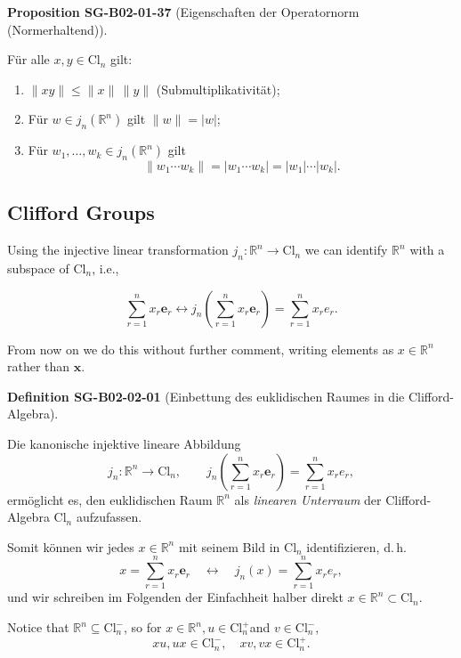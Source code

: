 \documentclass[10pt, letterpaper]{article}
\newcommand{\R}{\mathbb{R}}
\newcommand{\Cl}{\mathrm{Cl}}
\newcommand{\CustomHeading}[3]{%
  \par\medskip\noindent%
  \textbf{#1 #2} \textnormal{(#3)}.\enskip%
}
\newenvironment{DEF}[2]{\begin{unitbox}\CustomHeading{Definition}{#1}{#2}}{\end{unitbox}}
\newenvironment{PROP}[2]{\begin{unitbox}\CustomHeading{Proposition}{#1}{#2}}{\end{unitbox}}
\begin{document}
\begin{PROP}{SG-B02-01-37}{Eigenschaften der Operatornorm (Normerhaltend)}
Für alle $x,y \in \Cl_n$ gilt:
\begin{enumerate}[label=(\roman*)]
\item $\|xy\| \le \|x\|\,\|y\|$ (Submultiplikativität);
\item Für $w \in j_n(\R^n)$ gilt $\|w\| = |w|$;
\item Für $w_1,\ldots,w_k \in j_n(\R^n)$ gilt
\[
\|w_1 \cdots w_k\| = |w_1 \cdots w_k| = |w_1|\cdots|w_k|.
\]
\end{enumerate}
\end{PROP}





\pagebreak

\subsection{Clifford Groups}


Using the injective linear transformation $j_{n}: \mathbb{R}^{n} \longrightarrow \mathrm{Cl}_{n}$ we can identify $\mathbb{R}^{n}$ with a subspace of $\mathrm{Cl}_{n}$, i.e.,

$$
\sum_{r=1}^{n} x_{r} \mathbf{e}_{r} \longleftrightarrow j_{n}\left(\sum_{r=1}^{n} x_{r} \mathbf{e}_{r}\right)=\sum_{r=1}^{n} x_{r} e_{r} .
$$

From now on we do this without further comment, writing elements as $x \in \mathbb{R}^{n}$ rather than $\mathbf{x}$.



\begin{DEF}{SG-B02-02-01}{Einbettung des euklidischen Raumes in die Clifford-Algebra}
Die kanonische injektive lineare Abbildung
\[
j_n : \R^n \longrightarrow \Cl_n, 
\qquad 
j_n\!\left(\sum_{r=1}^n x_r \mathbf{e}_r\right) = \sum_{r=1}^n x_r e_r,
\]
ermöglicht es, den euklidischen Raum $\R^n$ als \emph{linearen Unterraum} der Clifford-Algebra $\Cl_n$ aufzufassen.

Somit können wir jedes $x \in \R^n$ mit seinem Bild in $\Cl_n$ identifizieren, d.\,h.
\[
x = \sum_{r=1}^n x_r \mathbf{e}_r
\quad\longleftrightarrow\quad
j_n(x) = \sum_{r=1}^n x_r e_r,
\]
und wir schreiben im Folgenden der Einfachheit halber direkt $x \in \R^n \subset \Cl_n$.
\end{DEF}



Notice that $\mathbb{R}^{n} \subseteq \mathrm{Cl}_{n}^{-}$, so for $x \in \mathbb{R}^{n}, u \in \mathrm{Cl}_{n}^{+}$and $v \in \mathrm{Cl}_{n}^{-}$,
$$
x u, u x \in \mathrm{Cl}_{n}^{-}, \quad x v, v x \in \mathrm{Cl}_{n}^{+} .
$$
\end{document}

